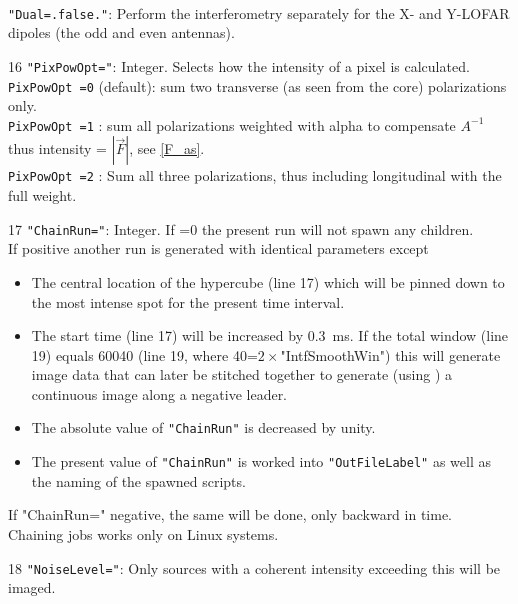 \begin{enumerate*}
   \\ \verb!"Dual=.false."!: Perform the interferometry separately for the X- and Y-LOFAR dipoles (the odd and even antennas).
\item[16] \verb!"PixPowOpt="!: Integer. Selects how the intensity of a pixel is calculated.
   \\\verb!PixPowOpt =0! (default): sum two transverse (as seen from the core) polarizations only.
   \\\verb!PixPowOpt =1! : sum all polarizations weighted with alpha to compensate $A^{-1}$ thus intensity =  $|\vec{F}|$, see \eqref{F_as}.
   \\\verb!PixPowOpt =2! : Sum all three polarizations, thus including longitudinal with the full weight.
\item[17] \verb!"ChainRun="!: Integer. If =0 the present run will not spawn any children. \\If positive another run is generated with identical parameters except
     \begin{itemize}
     \item The central location of the hypercube (line 17) which will be pinned down to the most intense spot for the present time interval.
     \item The start time (line 17) will be increased by 0.3~ms. If the total window (line 19) equals 60040 (line 19, where 40=$2\times$"IntfSmoothWin") this will generate image data that can later be stitched together to generate (using ) a continuous image along a negative leader.
     \item The absolute value of \verb!"ChainRun"! is decreased by unity.
     \item The present value of \verb!"ChainRun"! is worked into \verb!"OutFileLabel"! as well as the naming of the spawned scripts.
     \end{itemize}
     If "ChainRun=" negative, the same will be done, only backward in time. \\Chaining jobs works only on Linux systems.
\item[18] \verb!"NoiseLevel="!: Only sources with a coherent intensity exceeding this will be imaged.
\end{enumerate*}

